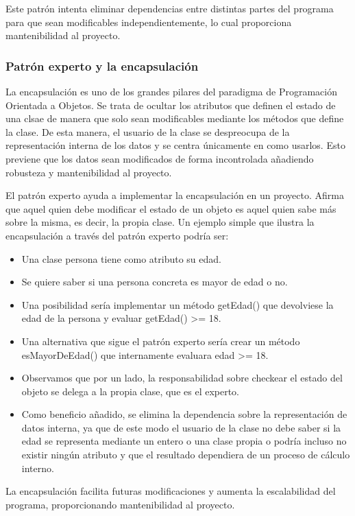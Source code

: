 \documentclass[12pt,a4paper,openright,oneside]{article}
\numberwithin{equation}{section}
\theoremstyle{definition}
\begin{document}
Este patrón intenta eliminar dependencias entre distintas partes del programa para que sean modificables independientemente, lo cual proporciona mantenibilidad al proyecto.

\subsubsection{Patrón experto y la encapsulación}
La encapsulación es uno de los grandes pilares del paradigma de Programación Orientada a Objetos. Se trata de ocultar los atributos que definen el estado de una clsae de manera que solo sean modificables mediante los métodos que define la clase. De esta manera, el usuario de la clase se despreocupa de la representación interna de los datos y se centra únicamente en como usarlos. Esto previene que los datos sean modificados de forma incontrolada añadiendo robusteza y mantenibilidad al proyecto.

El patrón experto ayuda a implementar la encapsulación en un proyecto. Afirma que aquel quien debe modificar el estado de un objeto es aquel quien sabe más sobre la misma, es decir, la propia clase. Un ejemplo simple que ilustra la encapsulación a través del patrón experto podría ser:

\begin{itemize}
\item Una clase persona tiene como atributo su edad. 
\item Se quiere saber si una persona concreta es mayor de edad o no.
\item Una posibilidad sería implementar un método getEdad() que devolviese la edad de la persona y evaluar getEdad() >= 18.
\item Una alternativa que sigue el patrón experto sería crear un método esMayorDeEdad() que internamente evaluara edad >= 18. 
\item Observamos que por un lado, la responsabilidad sobre checkear el estado del objeto se delega a la propia clase, que es el experto.
\item Como beneficio añadido, se elimina la dependencia sobre la representación de datos interna, ya que de este modo el usuario de la clase no debe saber si la edad se representa mediante un entero o una clase propia o podría incluso no existir ningún atributo y que el resultado dependiera de un proceso de cálculo interno. 
\end{itemize}

La encapsulación facilita futuras modificaciones y aumenta la escalabilidad del programa, proporcionando mantenibilidad al proyecto.
\end{document}
